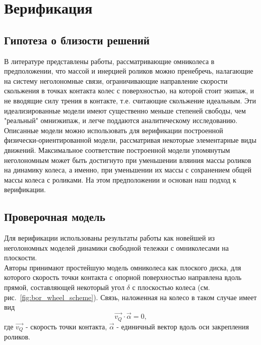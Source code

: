 \documentclass[12pt]{article}
\begin{document}
\section{Верификация}
\subsection{Гипотеза о близости решений}
В литературе представлены \cite{borisov, formalskii, kos4} работы, рассматривающие омниколеса в предположении, что массой и инерцией роликов можно пренебречь, налагающие на систему неголономные связи, ограничивающие направление скорости скольжения в точках контакта колес с поверхностью, на которой стоит экипаж, и не вводящие силу трения в контакте, т.е. считающие скольжение идеальным. Эти идеализированные модели имеют существенно меньше степеней свободы, чем "реальный" омниэкипаж, и легче поддаются аналитическому исследованию.\\

Описанные модели можно использовать для верификации построенной физически-ориентированной модели, рассматривая некоторые элементарные виды движений. Максимальное соответствие построенной модели упомянутым неголономным может быть достигнуто при уменьшении вляиния массы роликов на динамику колеса, а именно, при уменьшении их массы с сохранением общей массы колеса с роликами. На этом предположении и основан наш подход к верификации.\\

\subsection{Проверочная модель}

Для верификации использованы результаты работы \cite{borisov} как новейшей из неголономных моделей динамики свободной тележки с омниколесами на плоскости.\\

Авторы \cite{borisov} принимают простейшую модель омниколеса как плоского диска, для которого скорость точки контакта с опорной поверхностью направлена вдоль прямой, составляющей некоторый угол $\delta$ с плоскостью колеса (см. рис.~\ref{fig:bor_wheel_scheme}). Связь, наложенная на колесо в таком случае имеет вид
$$\vec{v_Q}\cdot\vec{\alpha} = 0,$$
где $\vec{v_Q}$ - скорость точки контакта, $\vec{\alpha}$ - единичный вектор вдоль оси закрепления роликов.\\
\end{document}
